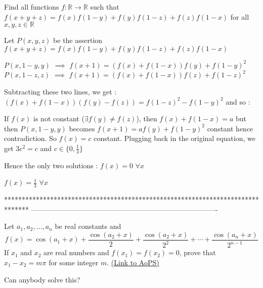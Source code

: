 \begin{solution}
	\begin{tcolorbox}Find all functions $ f: \mathbb{R}\to\mathbb{R}$ such that $ f(x + y + z) = f(x)f(1 - y) + f(y)f(1 - z) + f(z)f(1 - x)$ for all $ x,y,z\in\mathbb{R}$\end{tcolorbox}

Let $ P(x,y,z)$ be the assertion $ f(x + y + z) = f(x)f(1 - y) + f(y)f(1 - z) + f(z)f(1 - x)$


$ P(x,1 - y,y)$ $ \implies$ $ f(x + 1) = (f(x) + f(1 - x))f(y) + f(1 - y)^2$
$ P(x,1 - z,z)$ $ \implies$ $ f(x + 1) = (f(x) + f(1 - x))f(z) + f(1 - z)^2$

Subtracting these two lines, we get : $ (f(x) + f(1 - x))(f(y) - f(z)) = f(1 - z)^2 - f(1 - y)^2$ and so :

If $ f(x)$ is not constant ($ \exists f(y)\ne f(z)$), then $ f(x) + f(1 - x) = a$ but then $ P(x,1 - y,y)$ becomes $ f(x + 1) = af(y) + f(1 - y)^2$ constant hence contradiction.
So $ f(x) = c$ constant. Plugging back in the original equation, we get $ 3c^2 = c$ and $ c\in\{0,\frac 13\}$

Hence the only two solutions :
$ f(x) = 0$ $ \forall x$

$ f(x) = \frac 13$ $ \forall x$
\end{solution}
*******************************************************************************
-------------------------------------------------------------------------------

\begin{problem}
	Let $ a_1,a_2,\ldots,a_n$ be real constants and 
\[ f(x)=\cos(a_1+x)+\frac{\cos(a_2+x)}{2}+\frac{\cos(a_2+x)}{2^2}+\cdots +\frac{\cos(a_n+x)}{2^{n-1}}\]
If $ x_1$ and $x_2$ are real numbers and $ f(x_1)=f(x_2)=0$, prove that $ x_1-x_2=m\pi$ for some integer $ m$.
	\flushright \href{https://artofproblemsolving.com/community/c6h309421}{(Link to AoPS)}
\end{problem}



\begin{solution}
	Can anybody solve this?
\end{solution}



